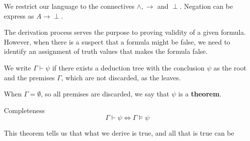 \documentclass{article}
\begin{document}
We restrict our language to the connectives $\land,\to$ and $\perp$. Negation
can be express as $A\to\perp$.
The derivation process serves the purpose to proving validity of a given
formula. However, when there is a suspect that a formula might be false, we
need to identify an assignment of truth values that makes the formula false.
\begin{Definition}{}{}
    We write $\Gamma\vdash\psi $ if there exists a deduction tree with the
    conclusion $\psi$ as the root and the premises $\Gamma$, which are not
    discarded, as the leaves.

    When $\Gamma=\emptyset$, so all premises are discarded, we say that $\psi$
    is a \textbf{theorem}.
\end{Definition}
\begin{Theorem}{Completeness}{}
   $$\Gamma\vdash\psi\Leftrightarrow\Gamma\models\psi$$
\end{Theorem}
This theorem tells us that what we derive is true, and all that is true can be
\end{document}
